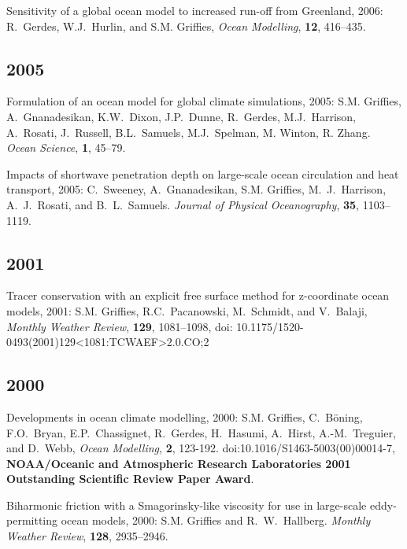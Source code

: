\begin{etaremune}
\item Sensitivity of a global ocean model to increased run-off from Greenland, 2006: R.\ Gerdes, W.J.\ Hurlin, and S.M. Grif\/f\/ies, {\em Ocean Modelling}, {\bf 12}, 416--435.
  
\subsection*{\sc \color{Maroon} 2005}
  
\item Formulation of an ocean model for global climate simulations, 2005: S.M. Grif\/f\/ies, A.\ Gnanadesikan, K.W.\ Dixon, J.P.\ Dunne, R.\ Gerdes, M.J.\ Harrison, A.\ Rosati, J.\ Russell, B.L.\ Samuels, M.J.\ Spelman, M. Winton, R. Zhang. {\em Ocean Science}, {\bf
1}, 45--79.

\item Impacts of shortwave penetration depth on large-scale ocean circulation and heat transport, 2005: C.\ Sweeney, A.\ Gnanadesikan, S.M. Grif\/f\/ies, M.\ J.\ Harrison, A.\ J.\ Rosati, and B.\ L.\ Samuels.  {\em Journal of Physical Oceanography}, {\bf 35},
1103--1119.

\subsection*{\sc \color{Maroon} 2001}

\item Tracer conservation with an explicit free surface method for z-coordinate ocean models, 2001: 
  S.M. Grif\/f\/ies, R.C.\  Pacanowski, M.\ Schmidt, and V.\ Balaji, {\em Monthly Weather  Review}, {\bf 129}, 1081--1098, doi: 10.1175/1520-0493(2001)129<1081:TCWAEF>2.0.CO;2

\subsection*{\sc \color{Maroon} 2000}

\item Developments in ocean climate modelling, 2000:  S.M. Grif\/f\/ies, C.\ B\"oning, F.O.\ Bryan, E.P.\ Chassignet, R.\  Gerdes, H.\ Hasumi, A.\ Hirst, A.-M.\ Treguier, and D.\ Webb, {\em Ocean Modelling}, {\bf 2}, 123-192. doi:10.1016/S1463-5003(00)00014-7,  {\bf NOAA/Oceanic and Atmospheric Research Laboratories 2001 Outstanding Scientific Review Paper Award}.

\item Biharmonic friction with a  Smagorinsky-like viscosity for use in large-scale eddy-permitting ocean models, 2000: S.M. Grif\/f\/ies and R.\ W.\ Hallberg.  {\em Monthly Weather Review}, {\bf 128}, 2935--2946.


\end{etaremune}
